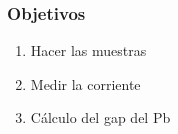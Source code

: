 \begin{frame}
\frametitle{Objetivos}

\begin{enumerate}[<+->]
	\item{Hacer las muestras}
	\item{Medir la corriente}
	\item{C\'alculo del gap del Pb}
\end{enumerate}

\end{frame}

